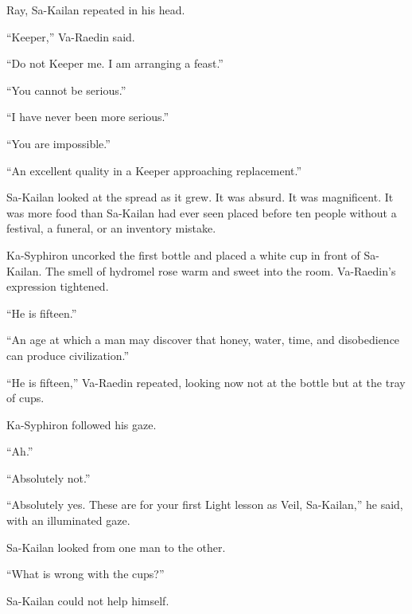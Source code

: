 Ray, Sa-Kailan repeated in his head.\par

“Keeper,” Va-Raedin said.\par

“Do not Keeper me.
I am arranging a feast.”\par

“You cannot be serious.”\par

“I have never been more serious.”\par

“You are impossible.”\par

“An excellent quality in a Keeper approaching replacement.”\par

Sa-Kailan looked at the spread as it grew.
It was absurd.
It was magnificent.
It was more food than Sa-Kailan had ever seen placed before ten people without a festival, a funeral, or an inventory mistake.\par

Ka-Syphiron uncorked the first bottle and placed a white cup in front of Sa-Kailan.
The smell of hydromel rose warm and sweet into the room.
Va-Raedin’s expression tightened.\par

“He is fifteen.”\par

“An age at which a man may discover that honey, water, time, and disobedience can produce civilization.”\par




“He is fifteen,” Va-Raedin repeated, looking now not at the bottle but at the tray of cups.\par
Ka-Syphiron followed his gaze.\par
“Ah.”\par
“Absolutely not.”\par
“Absolutely yes.
These are for your first Light lesson as Veil, Sa-Kailan,” he said, with an illuminated gaze.\par
Sa-Kailan looked from one man to the other.\par

“What is wrong with the cups?”\par

Sa-Kailan could not help himself.\par

